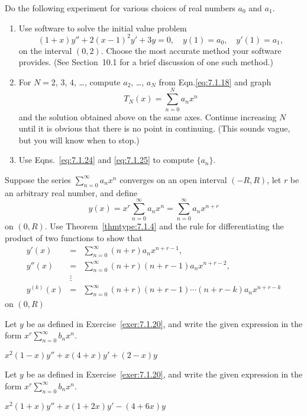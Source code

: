 \documentclass{ximera}
\begin{document}
\begin{problem}\label{exer:7.1.19}  
Do the following experiment for various choices of
real numbers  $a_0$ and $a_1$.
\begin{enumerate}
\item %
Use software  to solve the initial value problem
$$
(1+x)y''+2(x-1)^2y'+3y=0,\quad y(1)=a_0,\quad y'(1)=a_1,
$$
on the interval $(0,2)$. Choose the most accurate method
your software provides.
(See Section~10.1 for a brief discussion of one such
method.)
\item %
For $N=2$, $3$, $4$, \dots, compute $a_2$, \dots, $a_N$
from Eqn.\eqref{eq:7.1.18} and graph
$$
T_N(x)=\sum_{n=0}^N a_nx^n
$$
and the solution obtained above on the same axes.
Continue increasing $N$ until it is obvious that there is
no point in continuing.
(This sounds vague, but you will know when to stop.)
\item Use Eqns.~\eqref{eq:7.1.24} and \eqref{eq:7.1.25}
to compute $\{a_n\}$.
\end{enumerate}
\end{problem}

\begin{problem}\label{exer:7.1.20}
Suppose the series $\sum_{n=0}^\infty a_nx^n$ converges on an
open interval $(-R,R)$, let $r$ be an arbitrary real number, and
define
$$
y(x)=x^r\sum_{n=0}^\infty a_nx^n=\sum_{n=0}^\infty a_nx^{n+r}
$$
on $(0,R)$. Use Theorem~\ref{thmtype:7.1.4} and the rule for
differentiating the product of two functions to show that
\begin{eqnarray*}
y'(x)&=&\sum_{n=0}^\infty  (n+r)a_nx^{n+r-1},\\
y''(x)&=&\sum_{n=0}^\infty(n+r)(n+r-1)a_nx^{n+r-2},\\
&\vdots&\\
y^{(k)}(x)&=&\sum_{n=0}^\infty(n+r)(n+r-1)\cdots(n+r-k)a_nx^{n+r-k}
\end{eqnarray*}
on $(0,R)$
\end{problem}

\begin{problem}\label{exer:7.1.21}
Let $y$ be as defined in Exercise~\ref{exer:7.1.20}, and write the given
expression in the form $x^r\sum_{n=0}^\infty b_nx^n$.

$x^2(1-x)y''+x(4+x)y'+(2-x)y$
\end{problem}

\begin{problem}\label{exer:7.1.22}
Let $y$ be as defined in Exercise~\ref{exer:7.1.20}, and write the given
expression in the form $x^r\sum_{n=0}^\infty b_nx^n$.

$x^2(1+x)y''+x(1+2x)y'-(4+6x)y$
\end{problem}
\end{document}
